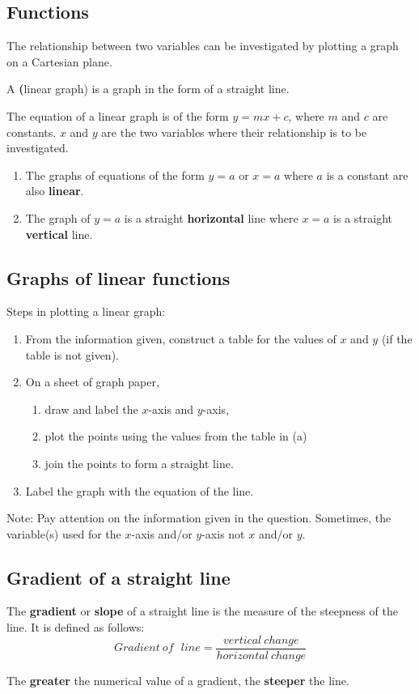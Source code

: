 \documentclass[../main]{subfiles}
\begin{document}
\subsection{Functions}
The relationship between two variables can be investigated by plotting a graph
on a Cartesian plane.

A \textbf(linear graph) is a graph in the form of a straight line.

The equation of a linear graph is of the form \(y=mx +c\), where \(m\) and \(c\)
are constants. \(x\) and \(y\) are the two variables where their relationship is
to be investigated.
\begin{enumerate}
\item  The graphs of equations of the form \(y=a\) or \(x =a\) where $a$ is a
  constant are also \textbf{linear}.
 
\item The graph of \(y=a\) is a straight \textbf{horizontal} line where \(x=a\)
  is a straight \textbf{vertical} line.
\end{enumerate}

\subsection{Graphs of linear functions}
Steps in plotting a linear graph:
\begin{enumerate}[label=(\alph*)]
\item From the information given, construct a table for the values of $x$ and
  $y$ (if the table is not given).
 
\item On a sheet of graph paper, 
  \begin{enumerate}[label=(\roman*)]
  \item draw and label the $x$-axis and $y$-axis,
  \item plot the points using the values from the table in (a)
  \item join the points to form a straight line. 
  \end{enumerate}

\item Label the graph with the equation of the line.
\end{enumerate}

Note: Pay attention on the information given in the question. Sometimes, the
variable(s) used for the $x$-axis and/or $y$-axis not $x$ and/or $y$.

\subsection{Gradient of a straight line}

The \textbf{gradient} or \textbf{slope} of a straight line is the measure of the
steepness of the line. It is defined as follows:
\[{Gradient\ of\ \ \ line}={\frac {vertical\ change} {horizontal\ change}}\]

The \textbf{greater} the numerical value of a gradient, the \textbf{steeper} the line.


  
\end{document}
